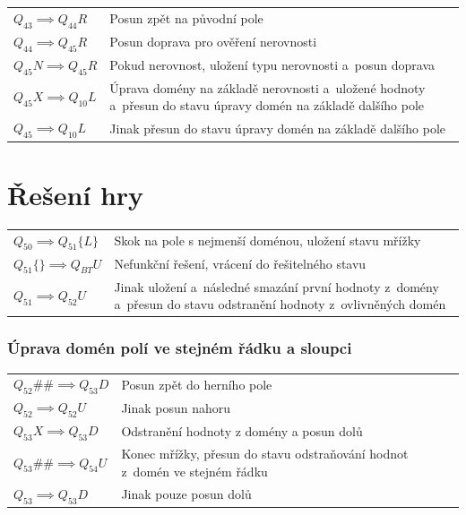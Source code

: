 \begin{tabular}{@{}p{4cm} p{10.5cm}@{}}
    \(Q_{43} \implies Q_{44}R\) & Posun zpět na původní pole \\
    \(Q_{44} \implies Q_{45}R\) & Posun doprava pro ověření nerovnosti \\
    \(Q_{45}N \implies Q_{45}R\) & Pokud nerovnost, uložení typu nerovnosti
        a~posun doprava \\
    \(Q_{45}X \implies Q_{10}L\) & Úprava domény na základě nerovnosti
        a~uložené hodnoty a~přesun do stavu úpravy domén na základě dalšího
        pole \\
    \(Q_{45} \implies Q_{10}L\) & Jinak přesun do stavu úpravy domén na základě
        dalšího pole \\
\end{tabular}

\section{Řešení hry}

\begin{tabular}{@{}p{4cm} p{10.5cm}@{}}
    \(Q_{50} \implies Q_{51}\{L\}\) & Skok na pole s nejmenší doménou, uložení
        stavu mřížky \\
    \(Q_{51}\{\} \implies Q_{BT}U\) & Nefunkční řešení, vrácení do řešitelného
        stavu \\
    \(Q_{51} \implies Q_{52}U\) & Jinak uložení a~následné smazání první
        hodnoty z~domény a~přesun do stavu odstranění hodnoty z~ovlivněných
        domén \\
\end{tabular}

\subsubsection*{Úprava domén polí ve stejném řádku a sloupci}

\begin{tabular}{@{}p{4cm} p{10.5cm}@{}}
    \(Q_{52}\#\# \implies Q_{53}D\) & Posun zpět do herního pole \\
    \(Q_{52} \implies Q_{52}U\) & Jinak posun nahoru \\

    \(Q_{53}X \implies Q_{53}D\) & Odstranění hodnoty z domény a posun dolů \\
    \(Q_{53}\#\# \implies Q_{54}U\) & Konec mřížky, přesun do stavu odstraňování
        hodnot z~domén ve stejném řádku \\
    \(Q_{53} \implies Q_{53}D\) & Jinak pouze posun dolů \\
\end{tabular}

